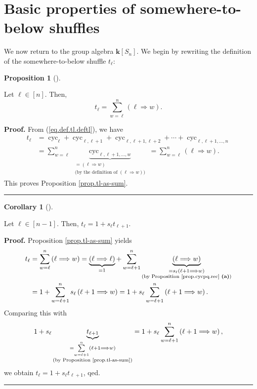 \documentclass[numbers=enddot,12pt,final,onecolumn,notitlepage]{scrartcl}%
\theoremstyle{definition}
\newtheorem{prop}[theo]{Proposition}
\newenvironment{proposition}[1][]
{\begin{prop}[#1]\begin{leftbar}}
{\end{leftbar}\end{prop}}
\newtheorem{coro}[theo]{Corollary}
\newenvironment{corollary}[1][]
{\begin{coro}[#1]\begin{leftbar}}
{\end{leftbar}\end{coro}}
\newenvironment{proof}[1][Proof]{\noindent\textbf{#1.} }{\ \rule{0.5em}{0.5em}}
\let\sumnonlimits\sum
\renewcommand{\sum}{\sumnonlimits\limits}
\begin{document}
\section{Basic properties of somewhere-to-below shuffles}

We now return to the group algebra $\mathbf{k}\left[  S_{n}\right]  $. We
begin by rewriting the definition of the somewhere-to-below shuffle $t_{\ell}$:

\begin{proposition}
\label{prop.tl-as-sum}Let $\ell\in\left[  n\right]  $. Then,%
\[
t_{\ell}=\sum_{w=\ell}^{n}\left(  \ell\Longrightarrow w\right)  .
\]

\end{proposition}

\begin{proof}
From (\ref{eq.def.tl.deftl}), we have%
\begin{align*}
t_{\ell}  &  =\operatorname*{cyc}\nolimits_{\ell}+\operatorname*{cyc}%
\nolimits_{\ell,\ell+1}+\operatorname*{cyc}\nolimits_{\ell,\ell+1,\ell
+2}+\cdots+\operatorname*{cyc}\nolimits_{\ell,\ell+1,\ldots,n}\\
&  =\sum_{w=\ell}^{n}\underbrace{\operatorname*{cyc}\nolimits_{\ell
,\ell+1,\ldots,w}}_{\substack{=\left(  \ell\Longrightarrow w\right)
\\\text{(by the definition of }\left(  \ell\Longrightarrow w\right)  \text{)}%
}}=\sum_{w=\ell}^{n}\left(  \ell\Longrightarrow w\right)  .
\end{align*}
This proves Proposition \ref{prop.tl-as-sum}.
\end{proof}

\begin{corollary}
\label{cor.tl-via-tl+1}Let $\ell\in\left[  n-1\right]  $. Then, $t_{\ell
}=1+s_{\ell}t_{\ell+1}$.
\end{corollary}

\begin{proof}
Proposition \ref{prop.tl-as-sum} yields%
\begin{align*}
t_{\ell}  &  =\sum_{w=\ell}^{n}\left(  \ell\Longrightarrow w\right)
=\underbrace{\left(  \ell\Longrightarrow\ell\right)  }_{=1}+\sum_{w=\ell
+1}^{n}\underbrace{\left(  \ell\Longrightarrow w\right)  }_{\substack{=s_{\ell
}\left(  \ell+1\Longrightarrow w\right)  \\\text{(by Proposition
\ref{prop.cycpq.rec} \textbf{(a)})}}}\\
&  =1+\sum_{w=\ell+1}^{n}s_{\ell}\left(  \ell+1\Longrightarrow w\right)
=1+s_{\ell}\sum_{w=\ell+1}^{n}\left(  \ell+1\Longrightarrow w\right)  .
\end{align*}
Comparing this with%
\[
1+s_{\ell}\underbrace{t_{\ell+1}}_{\substack{=\sum_{w=\ell+1}^{n}\left(
\ell+1\Longrightarrow w\right)  \\\text{(by Proposition \ref{prop.tl-as-sum}%
)}}}=1+s_{\ell}\sum_{w=\ell+1}^{n}\left(  \ell+1\Longrightarrow w\right)  ,
\]
we obtain $t_{\ell}=1+s_{\ell}t_{\ell+1}$, qed.
\end{proof}
\end{document}
